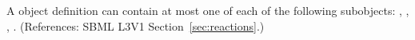 A \Reaction object definition can contain at most one of each of the
following subobjects: \ListOfReactants, \ListOfProducts, \ListOfModifiers,
\KineticLaw.  (References: SBML L3V1 Section~\ref{sec:reactions}.)

